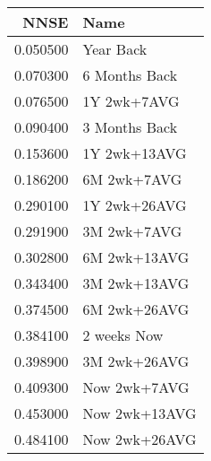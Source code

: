 \begin{tabular}{rl}
NNSE & Name \\
\hline
0.050500 & Year Back \\
0.070300 & 6 Months Back \\
0.076500 & 1Y 2wk+7AVG \\
0.090400 & 3 Months Back \\
0.153600 & 1Y 2wk+13AVG \\
0.186200 & 6M 2wk+7AVG \\
0.290100 & 1Y 2wk+26AVG \\
0.291900 & 3M 2wk+7AVG \\
0.302800 & 6M 2wk+13AVG \\
0.343400 & 3M 2wk+13AVG \\
0.374500 & 6M 2wk+26AVG \\
0.384100 & 2 weeks Now \\
0.398900 & 3M 2wk+26AVG \\
0.409300 & Now 2wk+7AVG \\
0.453000 & Now 2wk+13AVG \\
0.484100 & Now 2wk+26AVG \\
\hline
\end{tabular}